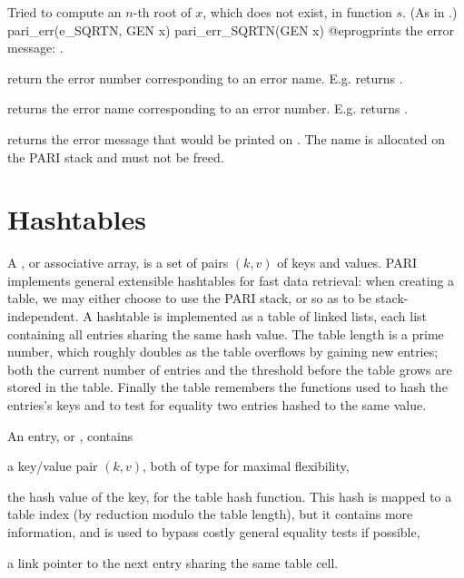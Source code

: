  Tried to compute an $n$-th root of $x$, which does not
exist, in function $s$.
(As in .)
\bprog
  pari_err(e_SQRTN, GEN x)
  pari_err_SQRTN(GEN x)
@eprog\noindent prints the error message: .


 return the error number corresponding to
an error name. E.g.  returns .

 returns the error name
corresponding to an error number. E.g.  returns
.

 returns the error message that would be
printed on  . The name is allocated on the PARI stack and
must not be freed.

\section{Hashtables}
A , or associative array, is a set of pairs $(k,v)$ of keys
and values. PARI implements general extensible hashtables for fast data
retrieval: when creating a table, we may either choose to use the PARI stack,
or  so as to be stack-independent. A hashtable is implemented as
a table of linked lists, each list containing all entries sharing the same
hash value. The table length is a prime number, which roughly doubles as the
table overflows by gaining new entries; both the current number of entries
and the threshold before the table grows are stored in the table. Finally the
table remembers the functions used to hash the entries's keys and to test for
equality two entries hashed to the same value.

An entry, or , contains

\item a key/value pair $(k,v)$, both of type  for maximal
flexibility,

\item the hash value of the key, for the table hash function. This hash is
mapped to a table index (by reduction modulo the table length), but it
contains more information, and is used to bypass costly general equality
tests if possible,

\item a link pointer to the next entry sharing the same table cell.

